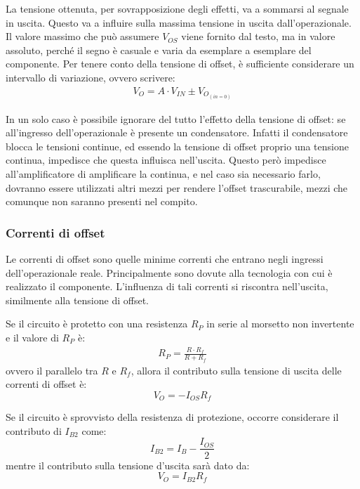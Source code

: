 \documentclass[a4paper,twocolumn,notitlepage]{book}
\begin{document}
	La tensione ottenuta, per sovrapposizione degli effetti, va a sommarsi al segnale in uscita. Questo va a influire sulla massima tensione in uscita dall'operazionale. 
	Il valore massimo che può assumere $V_{OS}$ viene fornito dal testo, ma in valore assoluto, perché il segno è casuale e varia da esemplare a esemplare del componente.
	Per tenere conto della tensione di offset, è sufficiente considerare un intervallo di variazione, ovvero scrivere:
	\begin{align*}
		V_O= A \cdot V_{IN} \pm V_{O_{(in=0)}} 
	\end{align*}
	
	In un solo caso è possibile ignorare del tutto l'effetto della tensione di offset: se all'ingresso dell'operazionale è presente un condensatore. Infatti il condensatore blocca le tensioni continue, ed essendo la tensione di offset proprio una tensione continua, impedisce che questa influisca nell'uscita. Questo però impedisce all'amplificatore di amplificare la continua, e nel caso sia necessario farlo, dovranno essere utilizzati altri mezzi per rendere l'offset trascurabile, mezzi che comunque non saranno presenti nel compito.
	
	\subsubsection*{Correnti di offset}
	Le correnti di offset sono quelle minime correnti che entrano negli ingressi dell'operazionale reale. Principalmente sono dovute alla tecnologia con cui è realizzato il componente. L'influenza di tali correnti si riscontra nell'uscita, similmente alla tensione di offset.
	
	Se il circuito è protetto con una resistenza $R_P$ in serie al morsetto non invertente e il valore di $R_P$ è:
	\begin{align*}
		R_P=\frac{R \cdot R_f}{R + R_f}
	\end{align*}
	ovvero il parallelo tra $R$ e $R_f$, allora il contributo sulla tensione di uscita delle correnti di offset è:
	\begin{equation}
		V_O=-I_{OS}R_f
	\end{equation}
	
	Se il circuito è sprovvisto della resistenza di protezione, occorre considerare il contributo di $I_{B2}$ come:
	\begin{equation}
		I_{B2}=I_B-\frac{I_{OS}}{2}
	\end{equation}
	mentre il contributo sulla tensione d'uscita sarà dato da:
	\begin{equation}
		V_O=I_{B2}R_f
	\end{equation}
	
\end{document}
